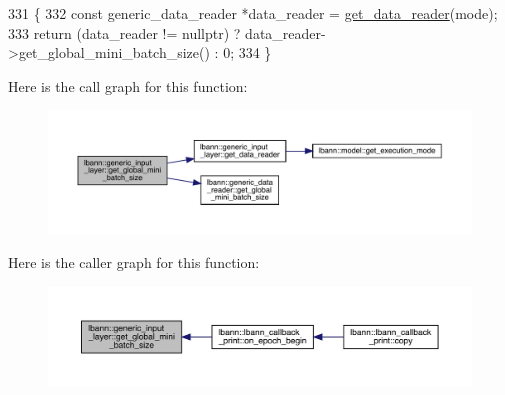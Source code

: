 \begin{DoxyCode}
331                                                                     \{
332     \textcolor{keyword}{const} generic\_data\_reader *data\_reader = \hyperlink{classlbann_1_1generic__input__layer_aba732becdb02627e3ad4493ac19e8fb6}{get\_data\_reader}(mode);
333     \textcolor{keywordflow}{return} (data\_reader != \textcolor{keyword}{nullptr}) ? data\_reader->get\_global\_mini\_batch\_size() : 0;
334   \}
\end{DoxyCode}
Here is the call graph for this function\+:\nopagebreak
\begin{figure}[H]
\begin{center}
\leavevmode
\includegraphics[width=350pt]{classlbann_1_1generic__input__layer_ac07b58c08183995852889dacfc69e459_cgraph}
\end{center}
\end{figure}
Here is the caller graph for this function\+:\nopagebreak
\begin{figure}[H]
\begin{center}
\leavevmode
\includegraphics[width=350pt]{classlbann_1_1generic__input__layer_ac07b58c08183995852889dacfc69e459_icgraph}
\end{center}
\end{figure}
\mbox{\label{classlbann_1_1generic__input__layer_a5e3c66c5726ab4a00d75bdcd2c07b640}} 
